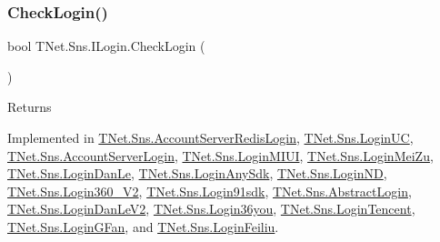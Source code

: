 \subsubsection{\texorpdfstring{Check\+Login()}{CheckLogin()}}
{\footnotesize\ttfamily bool T\+Net.\+Sns.\+I\+Login.\+Check\+Login (\begin{DoxyParamCaption}{ }\end{DoxyParamCaption})}





\begin{DoxyReturn}{Returns}

\end{DoxyReturn}


Implemented in \mbox{\hyperlink{class_t_net_1_1_sns_1_1_account_server_redis_login_a717e47c6c6203a793613cf8646701168}{T\+Net.\+Sns.\+Account\+Server\+Redis\+Login}}, \mbox{\hyperlink{class_t_net_1_1_sns_1_1_login_u_c_a1b22d8f5a48d7f62243e6cce124535ea}{T\+Net.\+Sns.\+Login\+UC}}, \mbox{\hyperlink{class_t_net_1_1_sns_1_1_account_server_login_a5ba57d3d6cd8792896e79dad1734e46a}{T\+Net.\+Sns.\+Account\+Server\+Login}}, \mbox{\hyperlink{class_t_net_1_1_sns_1_1_login_m_i_u_i_adcc9f0d697a5d8b1dece2f44028d8301}{T\+Net.\+Sns.\+Login\+M\+I\+UI}}, \mbox{\hyperlink{class_t_net_1_1_sns_1_1_login_mei_zu_a75e7963ccdc475af8d4378efc4becf70}{T\+Net.\+Sns.\+Login\+Mei\+Zu}}, \mbox{\hyperlink{class_t_net_1_1_sns_1_1_login_dan_le_a1b2ba443fc79ee95c2f6db09f9ff5283}{T\+Net.\+Sns.\+Login\+Dan\+Le}}, \mbox{\hyperlink{class_t_net_1_1_sns_1_1_login_any_sdk_a88210952068fcd88986d273ea6b04e86}{T\+Net.\+Sns.\+Login\+Any\+Sdk}}, \mbox{\hyperlink{class_t_net_1_1_sns_1_1_login_n_d_a2a3876bdd12ed6e5cc2bd6a653c2d2d0}{T\+Net.\+Sns.\+Login\+ND}}, \mbox{\hyperlink{class_t_net_1_1_sns_1_1_login360___v2_a2f0d6e19eeca9cf6e86522568767eec1}{T\+Net.\+Sns.\+Login360\+\_\+\+V2}}, \mbox{\hyperlink{class_t_net_1_1_sns_1_1_login91sdk_a7fb59241eea5837cf4dc7c0698502d98}{T\+Net.\+Sns.\+Login91sdk}}, \mbox{\hyperlink{class_t_net_1_1_sns_1_1_abstract_login_a6b5dac3d6d46efb7b1e4049e674105e5}{T\+Net.\+Sns.\+Abstract\+Login}}, \mbox{\hyperlink{class_t_net_1_1_sns_1_1_login_dan_le_v2_aa75919b2831492c20ce5952e1c506564}{T\+Net.\+Sns.\+Login\+Dan\+Le\+V2}}, \mbox{\hyperlink{class_t_net_1_1_sns_1_1_login36you_a87ec454ab2e41a350763b10827f1b179}{T\+Net.\+Sns.\+Login36you}}, \mbox{\hyperlink{class_t_net_1_1_sns_1_1_login_tencent_a47d0173c57f79fd4c14c5652046b2086}{T\+Net.\+Sns.\+Login\+Tencent}}, \mbox{\hyperlink{class_t_net_1_1_sns_1_1_login_g_fan_abdd4ebf96e43f40d650e107f598109dc}{T\+Net.\+Sns.\+Login\+G\+Fan}}, and \mbox{\hyperlink{class_t_net_1_1_sns_1_1_login_feiliu_a05c5de3660d07218535a0dd4fb77c748}{T\+Net.\+Sns.\+Login\+Feiliu}}.

